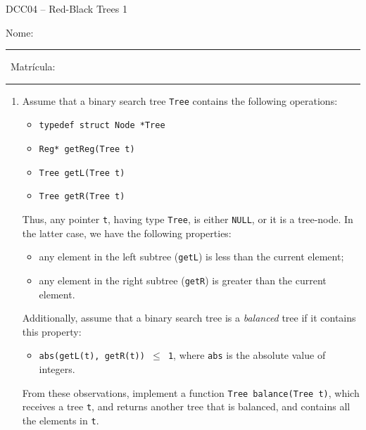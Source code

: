 \documentclass[12pt]{article}
\begin{document}
\begin{center}
\Large{DCC04 -- Red-Black Trees 1}
\end{center}

\vspace{1cm}

\noindent
Nome: \rule{8cm}{0.01in} \ Matr\'{i}cula: \rule{3cm}{0.01in}

\vspace{1cm}


\begin{enumerate}

\item Assume that a binary search tree \texttt{Tree} contains the following
operations:

\begin{itemize}
\item \texttt{typedef struct Node *Tree}

\item \texttt{Reg* getReg(Tree t)}

\item \texttt{Tree getL(Tree t)}

\item \texttt{Tree getR(Tree t)}
\end{itemize}

Thus, any pointer \texttt{t}, having type \texttt{Tree}, is either \texttt{NULL},
or it is a tree-node.
In the latter case, we have the following properties:

\begin{itemize}
\item any element in the left subtree (\texttt{getL}) is less than the 
current element;
\item any element in the right subtree (\texttt{getR}) is greater than the 
current element.
\end{itemize}

Additionally, assume that a binary search tree is a {\em balanced} tree if
it contains this property:

\begin{itemize}
\item \texttt{abs(getL(t), getR(t)) $\leq$ 1}, where \texttt{abs} is the
absolute value of integers.
\end{itemize}

From these observations, implement a function \texttt{Tree balance(Tree t)},
which receives a tree \texttt{t}, and returns another tree that is balanced,
and contains all the elements in \texttt{t}.


\end{enumerate}
\end{document}
